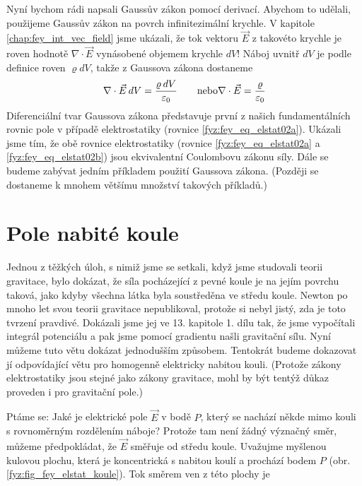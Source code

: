     Nyní bychom rádi napsali Gaussův zákon pomocí derivací. Abychom to udělali, použijeme Gaussův 
    zákon na povrch infinitezimální krychle. V kapitole \ref{chap:fey_int_vec_field} jsme ukázali, 
    že tok vektoru \(\vec{E}\) z takovéto krychle je roven hodnotě \(\nabla\cdot\vec{E}\) vynásobené 
    objemem krychle \(dV\)! Náboj uvnitř \(dV\) je podle definice roven \(\varrho dV\), takže z 
    Gaussova zákona dostaneme
    \begin{equation}\label{fyz:fey_eq_elstat38}
     \nabla\cdot\vec{E}\hspace{2pt}dV = \frac{\varrho\hspace{2pt}dV}{\varepsilon_0} \qquad 
     \text{nebo}
     \nabla\cdot\vec{E}       = \frac{\varrho}{\varepsilon_0}
    \end{equation}
    Diferenciální tvar Gaussova zákona představuje první z našich fundamentálních rovnic pole v 
    případě elektrostatiky (rovnice \ref{fyz:fey_eq_elstat02a}). Ukázali jsme tím, že obě rovnice 
    elektrostatiky (rovnice \ref{fyz:fey_eq_elstat02a} a \ref{fyz:fey_eq_elstat02b}) jsou 
    ekvivalentní Coulombovu zákonu síly. Dále se budeme zabývat jedním příkladem použití Gaussova 
    zákona. (Později se dostaneme k mnohem většímu množství takových příkladů.)
    
  \section{Pole nabité koule}  
    \cite[s.~77]{Feynman02} Jednou z těžkých úloh, s nimiž jsme se setkali, když jsme studovali 
    teorii gravitace, bylo dokázat, že síla pocházející z pevné koule je na jejím povrchu taková, 
    jako kdyby všechna látka byla soustředěna ve středu koule. Newton po mnoho let svou teorii 
    gravitace nepublikoval, protože si nebyl jistý, zda je toto tvrzení pravdivé. Dokázali jsme jej 
    ve 13. kapitole 1. dílu tak, že jsme vypočítali integrál potenciálu a pak jsme pomocí gradientu 
    našli gravitační sílu. Nyní můžeme tuto větu dokázat jednodušším způsobem. Tentokrát budeme 
    dokazovat jí odpovídající větu pro homogenně elektricky nabitou kouli. (Protože zákony 
    elektrostatiky jsou stejné jako zákony gravitace, mohl by být tentýž důkaz proveden i pro 
    gravitační pole.)
    
    Ptáme se: Jaké je elektrické pole \(\vec{E}\) v bodě \(P\), který se nachází někde mimo kouli s 
    rovnoměrným rozdělením náboje? Protože tam není žádný význačný směr, můžeme předpokládat, že 
    \(\vec{E}\) směřuje od středu koule. Uvažujme myšlenou kulovou plochu, která je koncentrická s 
    nabitou koulí a prochází bodem \(P\) (obr. \ref{fyz:fig_fey_elstat_koule}). Tok směrem ven z 
    této plochy je

